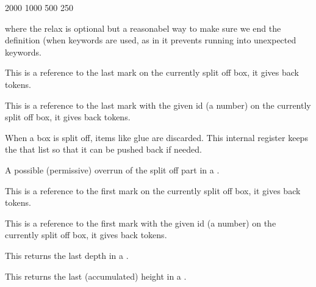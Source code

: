 \starttyping
\specificationdef\MyWidowPenalties
     2000 1000 500 250
\relax
\stoptyping

where the relax is optional but a reasonabel way to make sure we end the
definition (when keywords are used, as in  it prevents running
into unexpected keywords.

\stopnewprimitive

\startoldprimitive[title={\prm {splitbotmark}}][obsolete=yes]

This is a reference to the last mark on the currently split off box, it gives
back tokens.

\stopoldprimitive

\startoldprimitive[title={\prm {splitbotmarks}}]

This is a reference to the last mark with the given id (a number) on the
currently split off box, it gives back tokens.

\stopoldprimitive

\startoldprimitive[title={\prm {splitdiscards}}]

When a box is split off, items like glue are discarded. This internal register
keeps the that list so that it can be pushed back if needed.

\stopoldprimitive

\startnewprimitive[title={\prm {splitextraheight}}]

A possible (permissive) overrun of the split off part in a .

\stopnewprimitive

\startoldprimitive[title={\prm {splitfirstmark}}][obsolete=yes]

This is a reference to the first mark on the currently split off box, it gives
back tokens.

\stopoldprimitive

\startoldprimitive[title={\prm {splitfirstmarks}}]

This is a reference to the first mark with the given id (a number) on the
currently split off box, it gives back tokens.

\stopoldprimitive

\startnewprimitive[title={\prm {splitlastdepth}}]

This returns the last depth in a .

\stopnewprimitive

\startnewprimitive[title={\prm {splitlastheight}}]

This returns the last (accumulated) height in a .

